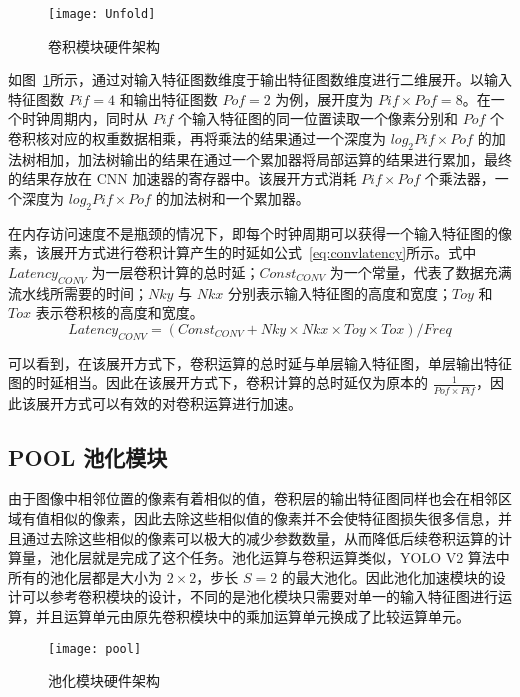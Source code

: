 \begin{figure}[!htbp]
    \centering
    \texttt{[image: Unfold]}
    \caption{卷积模块硬件架构}
    \label{fig:Unfold}
\end{figure}

如图~\ref{fig:Unfold}所示，通过对输入特征图数维度于输出特征图数维度进行二维展开。以输入特征图数 $Pif = 4$ 和输出特征图数 $Pof = 2$ 为例，展开度为 $Pif \times Pof = 8$。在一个时钟周期内，同时从 $Pif$ 个输入特征图的同一位置读取一个像素分别和 $Pof$ 个卷积核对应的权重数据相乘，再将乘法的结果通过一个深度为 $log_2{Pif\times Pof}$ 的加法树相加，加法树输出的结果在通过一个累加器将局部运算的结果进行累加，最终的结果存放在 CNN 加速器的寄存器中。该展开方式消耗 $Pif \times Pof$ 个乘法器，一个深度为 $log_2{Pif \times Pof}$ 的加法树和一个累加器。

在内存访问速度不是瓶颈的情况下，即每个时钟周期可以获得一个输入特征图的像素，该展开方式进行卷积计算产生的时延如公式~\ref{eq:convlatency}所示。式中 $Latency_{CONV}$ 为一层卷积计算的总时延；$Const_{CONV}$ 为一个常量，代表了数据充满流水线所需要的时间；$Nky$ 与 $Nkx$ 分别表示输入特征图的高度和宽度；$Toy$ 和 $Tox$ 表示卷积核的高度和宽度。 
\begin{equation} \label{eq:convlatency}
Latency_{CONV} = (Const_{CONV} + Nky \times Nkx \times Toy \times Tox)/Freq
\end{equation}

可以看到，在该展开方式下，卷积运算的总时延与单层输入特征图，单层输出特征图的时延相当。因此在该展开方式下，卷积计算的总时延仅为原本的 $\frac{1}{Pof \times Pif}$，因此该展开方式可以有效的对卷积运算进行加速。

\subsection{POOL 池化模块}

由于图像中相邻位置的像素有着相似的值，卷积层的输出特征图同样也会在相邻区域有值相似的像素，因此去除这些相似值的像素并不会使特征图损失很多信息，并且通过去除这些相似的像素可以极大的减少参数数量，从而降低后续卷积运算的计算量，池化层就是完成了这个任务。池化运算与卷积运算类似，YOLO V2 算法中所有的池化层都是大小为 $2 \times 2$，步长 $S = 2$ 的最大池化。因此池化加速模块的设计可以参考卷积模块的设计，不同的是池化模块只需要对单一的输入特征图进行运算，并且运算单元由原先卷积模块中的乘加运算单元换成了比较运算单元。

\begin{figure}[!htbp]
    \centering
    \texttt{[image: pool]}
    \caption{池化模块硬件架构}
    \label{fig:pool}
\end{figure}

